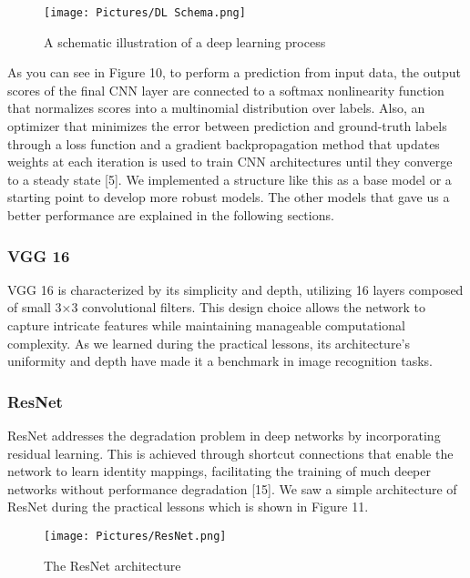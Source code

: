 \documentclass[a4paper, twocolumn, 11pt]{article}
\begin{document}
\begin{figure}[h!]
    \centering
    \texttt{[image: Pictures/DL Schema.png]}
    \caption{A schematic illustration of a deep learning process}
    \label{fig:Figure 10}
\end{figure}

As you can see in Figure 10, to perform a prediction from input data, the output scores of the final CNN layer are connected to a softmax nonlinearity function that normalizes scores into a multinomial distribution over labels. Also, an optimizer that minimizes the error between prediction and ground-truth labels through a loss function and a gradient backpropagation method that updates weights at each iteration is used to train CNN architectures until they converge to a steady state [5]. We implemented a structure like this as a base model or a starting point to develop more robust models. The other models that gave us a better performance are explained in the following sections.
\vspace{7pt}

\subsubsection{VGG 16}
VGG 16 is characterized by its simplicity and depth, utilizing 16 layers composed of small 3×3 convolutional filters. This design choice allows the network to capture intricate features while maintaining manageable computational complexity. As we learned during the practical lessons, its architecture's uniformity and depth have made it a benchmark in image recognition tasks. 
\vspace{7pt}

\subsubsection{ResNet}
ResNet addresses the degradation problem in deep networks by incorporating residual learning. This is achieved through shortcut connections that enable the network to learn identity mappings, facilitating the training of much deeper networks without performance degradation [15]. We saw a simple architecture of ResNet during the practical lessons which is shown in Figure 11.

\begin{figure}[h!]
    \centering
    \texttt{[image: Pictures/ResNet.png]}
    \caption{The ResNet architecture}
    \label{fig:Figure 11}
\end{figure}
\end{document}
